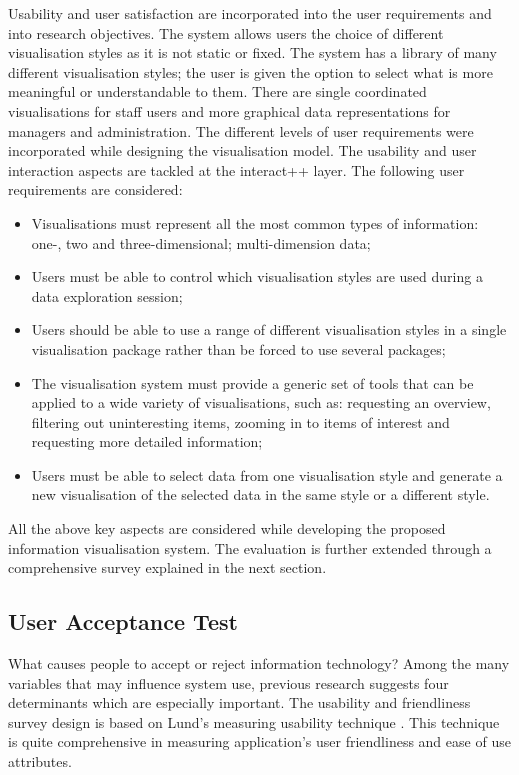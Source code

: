 Usability and user satisfaction are incorporated into the user requirements and into research objectives. The system allows  users the choice of different visualisation styles as it is not static or fixed. The system has a library of many different visualisation styles; the user is given the option to select what is more meaningful or understandable to them. There are single coordinated visualisations for staff users and more graphical data representations for managers and administration. The different levels of user requirements were incorporated while designing the visualisation model. The usability and user interaction aspects are tackled at the interact++ layer. The following user requirements are considered:
\begin{itemize}

\item 	Visualisations must represent all the most common types of information: one-, two and three-dimensional; multi-dimension data;
\item 	Users must be able to control which visualisation styles are used during a data exploration session;
\item 	Users should be able to use a range of different visualisation styles in a single visualisation package rather than be forced to use several packages;
\item 	The visualisation system must provide a generic set of tools that can be applied to a wide variety of visualisations, such as: requesting an overview, filtering out uninteresting items, zooming in to items of interest and requesting more detailed information;
\item 	Users must be able to select data from one visualisation style and generate a new visualisation of the selected data in the same style or a different style.
\end{itemize}

All the above key aspects are considered while developing the proposed information visualisation system. The evaluation is further extended through a comprehensive survey explained in the next section.

\subsection{User Acceptance Test}

What causes people to accept or reject information technology? Among the many variables that may influence system use, previous research suggests four determinants which are especially important. The usability and friendliness survey design is based on Lund's measuring usability technique \cite{lund2001measuring}. This technique is quite comprehensive in measuring application's user friendliness and ease of use attributes.

